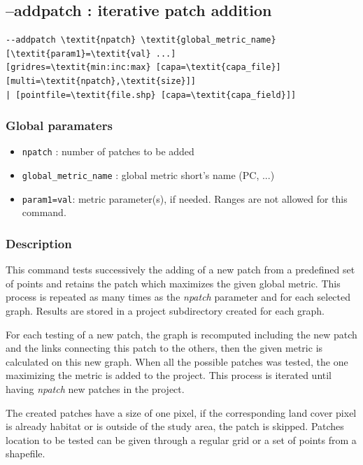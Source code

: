 \documentclass[a4paper,10pt]{report}
\begin{document}
\subsection{--addpatch : iterative patch addition}
\begin{Verbatim}[commandchars=\\\{\}]
--addpatch \textit{npatch} \textit{global_metric_name} [\textit{param1}=\textit{val} ...]
[gridres=\textit{min:inc:max} [capa=\textit{capa_file}] [multi=\textit{npatch},\textit{size}]]
| [pointfile=\textit{file.shp} [capa=\textit{capa_field}]]
\end{Verbatim}

\subsubsection{Global paramaters}
\begin{itemize}
	\item \verb|npatch| : number of patches to be added
	\item \verb|global_metric_name| : global metric short's name (PC, ...)
	\item \verb|param1=val|: metric parameter(s), if needed. Ranges are not allowed for this command.
\end{itemize}

\subsubsection{Description}
This command tests successively the adding of a new patch from a predefined set of points and retains the patch which maximizes the given global metric.
This process is repeated as many times as the \textit{npatch} parameter and for each selected graph. 
Results are stored in a project subdirectory created for each graph.

For each testing of a new patch, the graph is recomputed including the new patch and the links connecting this patch to the others, then the given metric is calculated on this new graph.
When all the possible patches was tested, the one maximizing the metric is added to the project.
This process is iterated until having \textit{npatch} new patches in the project.

The created patches have a size of one pixel, if the corresponding land cover pixel is already habitat or is outside of the study area, the patch is skipped.
Patches location to be tested can be given through a regular grid or a set of points from a shapefile.
\end{document}
